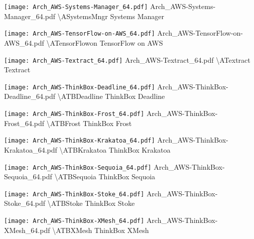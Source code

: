  {\texttt{[image: Arch\_AWS-Systems-Manager\_64.pdf]}} {Arch\_AWS-Systems-Manager\_64.pdf} {{\textbackslash}ASystemsMngr} {Systems Manager}

 {\texttt{[image: Arch\_AWS-TensorFlow-on-AWS\_64.pdf]}} {Arch\_AWS-TensorFlow-on-AWS\_64.pdf} {{\textbackslash}ATensorFlowon} {TensorFlow on AWS}

 {\texttt{[image: Arch\_AWS-Textract\_64.pdf]}} {Arch\_AWS-Textract\_64.pdf} {{\textbackslash}ATextract} {Textract}

 {\texttt{[image: Arch\_AWS-ThinkBox-Deadline\_64.pdf]}} {Arch\_AWS-ThinkBox-Deadline\_64.pdf} {{\textbackslash}ATBDeadline} {ThinkBox Deadline}

 {\texttt{[image: Arch\_AWS-ThinkBox-Frost\_64.pdf]}} {Arch\_AWS-ThinkBox-Frost\_64.pdf} {{\textbackslash}ATBFrost} {ThinkBox Frost}

 {\texttt{[image: Arch\_AWS-ThinkBox-Krakatoa\_64.pdf]}} {Arch\_AWS-ThinkBox-Krakatoa\_64.pdf} {{\textbackslash}ATBKrakatoa} {ThinkBox Krakatoa}

 {\texttt{[image: Arch\_AWS-ThinkBox-Sequoia\_64.pdf]}} {Arch\_AWS-ThinkBox-Sequoia\_64.pdf} {{\textbackslash}ATBSequoia} {ThinkBox Sequoia}

 {\texttt{[image: Arch\_AWS-ThinkBox-Stoke\_64.pdf]}} {Arch\_AWS-ThinkBox-Stoke\_64.pdf} {{\textbackslash}ATBStoke} {ThinkBox Stoke}

 {\texttt{[image: Arch\_AWS-ThinkBox-XMesh\_64.pdf]}} {Arch\_AWS-ThinkBox-XMesh\_64.pdf} {{\textbackslash}ATBXMesh} {ThinkBox XMesh}

